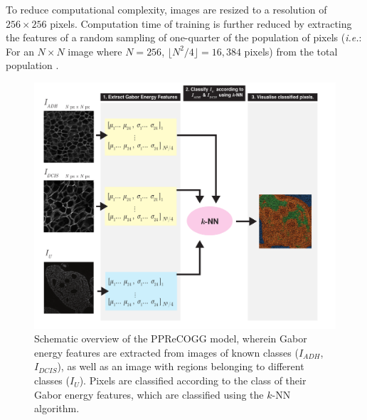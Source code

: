 To reduce computational complexity, images are resized to a resolution of
$256\times256$ pixels. Computation time of training is further reduced by
extracting the features of a random sampling of one-quarter of the population of pixels 
(\emph{i.e.}: For an $N \times N$ image where $N=256$, $\lfloor N^2/4 \rfloor = 16,384$ pixels) from the total population .

\begin{figure}[ht!]
	\centering
	\includegraphics[width=180mm]{figures/pprecogg_summary.pdf}
	\caption{Schematic overview of the PPReCOGG model, wherein Gabor energy features are extracted from images of known classes ($I_{ADH}$, $I_{DCIS}$), as well as an image with regions belonging to different classes ($I_U$). Pixels are classified according to the class of their Gabor energy features, which are classified using the $k$-NN algorithm. \label{pprecogg_summary}}
	
\end{figure}







